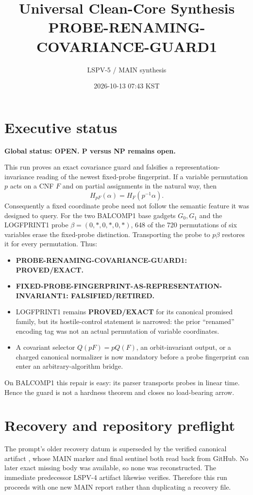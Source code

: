 \documentclass[11pt]{article}
\title{Universal Clean-Core Synthesis\\\large PROBE-RENAMING-COVARIANCE-GUARD1}
\author{LSPV-5 / MAIN synthesis}
\date{2026-10-13 07:43 KST}
\newcommand{\OPEN}{\textbf{OPEN}}
\newcommand{\EXACT}{\textbf{PROVED/EXACT}}
\newcommand{\RET}{\textbf{FALSIFIED/RETIRED}}
\begin{document}
\maketitle

\section{Executive status}

\noindent\textbf{Global status: \OPEN.  P versus NP remains open.}

This run proves an exact covariance guard and falsifies a representation-invariance
reading of the newest fixed-probe fingerprint.  If a variable permutation $p$ acts on
a CNF $F$ and on partial assignments in the natural way, then
\[
        H_{pF}(\alpha)=H_F(p^{-1}\alpha).
\]
Consequently a fixed coordinate probe need not follow the semantic feature it was
designed to query.  For the two BALCOMP1 base gadgets $G_0,G_1$ and the LOGFPRINT1
probe $\beta=(0,*,0,*,0,*)$, 648 of the 720 permutations of six variables erase the
fixed-probe distinction.  Transporting the probe to $p\beta$ restores it for every
permutation.  Thus:
\begin{itemize}
\item \textbf{PROBE-RENAMING-COVARIANCE-GUARD1: \EXACT.}
\item \textbf{FIXED-PROBE-FINGERPRINT-AS-REPRESENTATION-INVARIANT1: \RET.}
\item LOGFPRINT1 remains \EXACT{} for its canonical promised family, but its
      hostile-control statement is narrowed: the prior ``renamed'' encoding tag was
      not an actual permutation of variable coordinates.
\item A covariant selector $Q(pF)=pQ(F)$, an orbit-invariant output, or a charged
      canonical normalizer is now mandatory before a probe fingerprint can enter an
      arbitrary-algorithm bridge.
\end{itemize}
On BALCOMP1 this repair is easy: its parser transports probes in linear time.  Hence the
guard is not a hardness theorem and closes no load-bearing arrow.

\section{Recovery and repository preflight}

The prompt's older recovery datum is superseded by the verified canonical artifact
, whose MAIN marker and
final sentinel both read back from GitHub.  No later exact missing body was available,
so none was reconstructed.  The immediate predecessor LSPV-4 artifact
 likewise verifies.
Therefore this run proceeds with one new MAIN report rather than duplicating a recovery
file.
\end{document}
